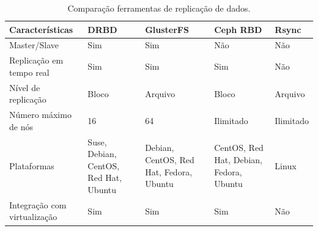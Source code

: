 \begin{table}[h!]
\caption{Comparação ferramentas de replicação de dados.}
\label{tab:replicacao}
\begin{center}
\begin{tabular}{|l|p{2.7cm}|p{2.7cm}|p{2.7cm}|p{2cm}|}\hline
Características & DRBD & GlusterFS & Ceph RBD & Rsync\\\hline
Master/Slave & Sim & Sim & Não & Não \\\hline
Replicação em tempo real & Sim & Sim & Sim & Não \\\hline
Nível de replicação & Bloco & Arquivo & Bloco & Arquivo \\\hline
Número máximo de nós & 16 & 64 & Ilimitado & Ilimitado \\\hline
Plataformas & Suse, Debian, CentOS, Red Hat, Ubuntu & Debian, CentOS, Red Hat, Fedora, Ubuntu & CentOS, Red Hat, Debian, Fedora, Ubuntu & Linux \\\hline
Integração com virtualização & Sim & Sim & Sim & Não \\\hline
\end{tabular}
\end{center}
\end{table}






